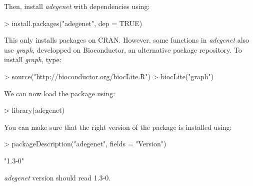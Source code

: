\documentclass{article}
\begin{document}
Then, install \textit{adegenet} with dependencies using:
\begin{Schunk}
\begin{Sinput}
> install.packages("adegenet", dep = TRUE)
\end{Sinput}
\end{Schunk}
This only installs packages on CRAN.
However, some functions in \textit{adegenet} also use \textit{graph}, developped on Bioconductor, an
alternative package repository.
To install \textit{graph}, type:
\begin{Schunk}
\begin{Sinput}
> source("http://bioconductor.org/biocLite.R")
> biocLite("graph")
\end{Sinput}
\end{Schunk}

We can now load the package using:
\begin{Schunk}
\begin{Sinput}
> library(adegenet)
\end{Sinput}
\end{Schunk}

\noindent You can make sure that the right version of the package is installed using:
\begin{Schunk}
\begin{Sinput}
> packageDescription("adegenet", fields = "Version")
\end{Sinput}
\begin{Soutput}
[1] "1.3-0"
\end{Soutput}
\end{Schunk}
\textit{adegenet} version should read 1.3-0.




\end{document}

